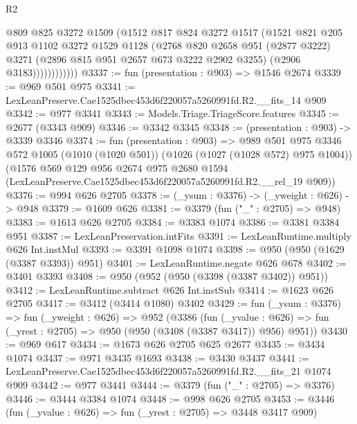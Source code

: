 \begin{lexlean}{R2}
\begin{coremodule}
                    @809
                    @825
                    @3272
                    @1509
                    (@1512
                      @817
                      @824
                      @3272
                      @1517
                      (@1521
                        @821
                        @205
                        @913
                        @1102
                        @3272
                        @1529
                        @1128
                        (@2768
                          @820
                          @2658
                          @951
                          (@2877 @3222)
                          @3271
                          (@2896 @815 @951 @2657 @673 @3222 @2902 @3255)
                          (@2906 @3183))))))))))))
@3337 := fun (presentation : @903) => @1546 @2674
@3339 := @969 @501 @975
@3341 := LexLeanPreserve.Cae1525dbec453d6f220057a5260991fd.R2.__fits_14 @909
@3342 := @977 @3341
@3343 := Models.Triage.TriageScore.features
@3345 := @2677 (@3343 @909)
@3346 := @3342 @3345
@3348 := (presentation : @903) -> @3339 @3346
@3374 := fun (presentation : @903) =>
  @989
    @501
    @975
    @3346
    @572
    @1005
    (@1010 (@1020 @501))
    (@1026 (@1027 (@1028 @572) @975 @1004))
    (@1576
      @569
      @129
      @956
      @2674
      @975
      @2680
      @1594
      (LexLeanPreserve.Cae1525dbec453d6f220057a5260991fd.R2.__rel_19 @909))
@3376 := @994 @626 @2705
@3378 := (_ysum : @3376) -> (_yweight : @626) -> @948
@3379 := @1609 @626
@3381 := @3379 (fun ("_" : @2705) => @948)
@3383 := @1613 @626 @2705
@3384 := @3383 @1074
@3386 := @3381 @3384 @951
@3387 := LexLeanPreservation.intFits
@3391 := LexLeanRuntime.multiply @626 Int.instMul
@3393 := @3391 @1098 @1074
@3398 := @950 (@950 (@1629 (@3387 @3393)) @951)
@3401 := LexLeanRuntime.negate @626 @678
@3402 := @3401 @3393
@3408 := @950 (@952 (@950 (@3398 (@3387 @3402)) @951))
@3412 := LexLeanRuntime.subtract @626 Int.instSub
@3414 := @1623 @626 @2705
@3417 := @3412 (@3414 @1080) @3402
@3429 := fun (_ysum : @3376) =>
  fun (_yweight : @626) =>
  @952
    (@3386
      (fun (_yvalue : @626) => fun (_yrest : @2705) => @950 (@950 (@3408 (@3387 @3417)) @956) @951))
@3430 := @969 @617
@3434 := @1673 @626 @2705 @625 @2677
@3435 := @3434 @1074
@3437 := @971 @3435 @1693
@3438 := @3430 @3437
@3441 := LexLeanPreserve.Cae1525dbec453d6f220057a5260991fd.R2.__fits_21 @1074 @909
@3442 := @977 @3441
@3444 := @3379 (fun ("_" : @2705) => @3376)
@3446 := @3444 @3384 @1074
@3448 := @998 @626 @2705
@3453 := @3446 (fun (_yvalue : @626) => fun (_yrest : @2705) => @3448 @3417 @909)

\end{coremodule}
\end{lexlean}
